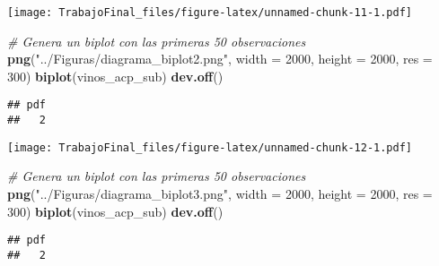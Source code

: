 \documentclass[
]{article}
\newenvironment{Shaded}{\begin{snugshade}}{\end{snugshade}}
\newcommand{\AttributeTok}[1]{\textcolor[rgb]{0.13,0.29,0.53}{#1}}
\newcommand{\CommentTok}[1]{\textcolor[rgb]{0.56,0.35,0.01}{\textit{#1}}}
\newcommand{\DecValTok}[1]{\textcolor[rgb]{0.00,0.00,0.81}{#1}}
\newcommand{\FunctionTok}[1]{\textcolor[rgb]{0.13,0.29,0.53}{\textbf{#1}}}
\newcommand{\NormalTok}[1]{#1}
\newcommand{\OtherTok}[1]{\textcolor[rgb]{0.56,0.35,0.01}{#1}}
\newcommand{\SpecialCharTok}[1]{\textcolor[rgb]{0.81,0.36,0.00}{\textbf{#1}}}
\newcommand{\StringTok}[1]{\textcolor[rgb]{0.31,0.60,0.02}{#1}}
\begin{document}
\texttt{[image: TrabajoFinal\_files/figure-latex/unnamed-chunk-11-1.pdf]}

\begin{Shaded}
\begin{Highlighting}[]
\CommentTok{\# Genera un biplot con las primeras 50 observaciones}
\FunctionTok{png}\NormalTok{(}\StringTok{"../Figuras/diagrama\_biplot2.png"}\NormalTok{, }\AttributeTok{width =} \DecValTok{2000}\NormalTok{, }\AttributeTok{height =} \DecValTok{2000}\NormalTok{, }\AttributeTok{res =} \DecValTok{300}\NormalTok{)}
\FunctionTok{biplot}\NormalTok{(vinos\_acp\_sub)}
\FunctionTok{dev.off}\NormalTok{()}
\end{Highlighting}
\end{Shaded}

\begin{verbatim}
## pdf 
##   2
\end{verbatim}

\begin{Shaded}
\end{Shaded}

\texttt{[image: TrabajoFinal\_files/figure-latex/unnamed-chunk-12-1.pdf]}

\begin{Shaded}
\begin{Highlighting}[]
\CommentTok{\# Genera un biplot con las primeras 50 observaciones}
\FunctionTok{png}\NormalTok{(}\StringTok{"../Figuras/diagrama\_biplot3.png"}\NormalTok{, }\AttributeTok{width =} \DecValTok{2000}\NormalTok{, }\AttributeTok{height =} \DecValTok{2000}\NormalTok{, }\AttributeTok{res =} \DecValTok{300}\NormalTok{)}
\FunctionTok{biplot}\NormalTok{(vinos\_acp\_sub)}
\FunctionTok{dev.off}\NormalTok{()}
\end{Highlighting}
\end{Shaded}

\begin{verbatim}
## pdf 
##   2
\end{verbatim}
\end{document}
